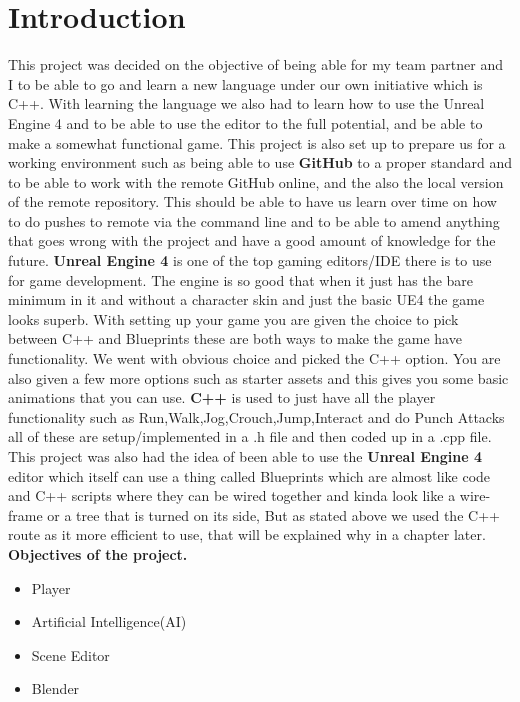 \chapter{Introduction}
This project was decided on the objective of being able for my team partner and I to be able to go and learn a new language under our own initiative which is C++. With learning the language we also had to learn how to use the Unreal Engine 4 and to be able to use the editor to the full potential, and be able to make a somewhat functional game. This project is also set up to prepare us for a working environment such as being able to use \textbf{GitHub} to a proper standard and to be able to work with the remote GitHub online, and the also the local version of the remote repository. This should be able to have us learn over time on how to do pushes to remote via the command line and to be able to amend anything that goes wrong with the project and have a good amount of knowledge for the future.
\newline 
\newline
\textbf{Unreal Engine 4} is one of the top gaming editors/IDE there is to use for game development. The engine is so good that when it just has the bare minimum in it and without a character skin and just the basic UE4 the game looks superb. With setting up your game you are given the choice to pick between C++ and Blueprints these are both ways to make the game have functionality. We went with obvious choice and picked the C++ option. 
You are also given a few more options such as starter assets and this gives you some basic animations that you can use.
\newline
\newline
\textbf{C++} is used to just have all the player functionality such as
\newline Run,Walk,Jog,Crouch,Jump,Interact and do Punch Attacks all of these are setup/implemented in a .h file and then coded up in a .cpp file. This project was also had the idea of been able to use the \textbf{Unreal Engine 4} editor which itself can use a thing called Blueprints which are almost like code and C++ scripts where they can be wired together and kinda look like a wire-frame or a tree that is turned on its side, But as stated above we used the C++ route as it more efficient to use, that will be explained why in a chapter later.
\newline
\newline
\textbf{Objectives of the project.}
\begin{itemize}
    \item Player
    \item Artificial Intelligence(AI)
    \item Scene Editor
    \item Blender
\end{itemize}
